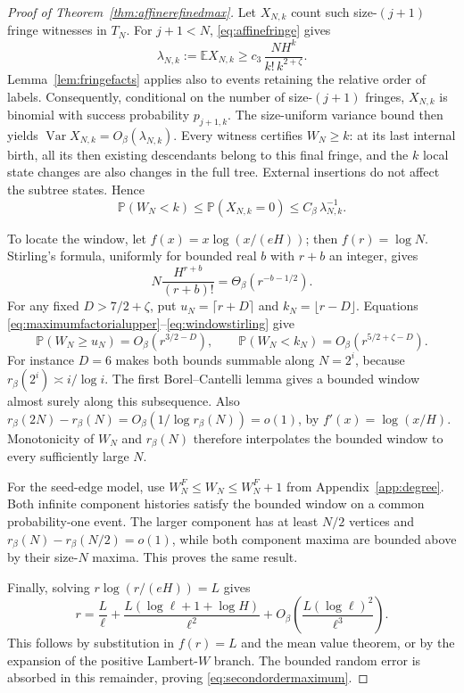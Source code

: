 \documentclass[runningheads,envcountsame,orivec]{llncs}
\newcommand{\E}{\mathbb E}
\newcommand{\PP}{\mathbb P}
\begin{document}
\begin{proof}[Proof of Theorem~\ref{thm:affinerefinedmax}]
Let $X_{N,k}$ count such size-$(j+1)$ fringe witnesses in $T_N$.
For $j+1<N$, \eqref{eq:affinefringe} gives
\begin{equation}\label{eq:witnessmean}
 \lambda_{N,k}:=\E X_{N,k}
 \ge c_3\,\frac{N H^k}{k!\,k^{2+\zeta}}.
\end{equation}
Lemma~\ref{lem:fringefacts}
applies also to events retaining the relative order of labels.
Consequently, conditional on the number of size-$(j+1)$ fringes,
$X_{N,k}$ is binomial with success probability $p_{j+1,k}$.
The size-uniform variance bound then yields
$\operatorname{Var}X_{N,k}=O_\beta(\lambda_{N,k})$.
Every witness certifies $W_N\ge k$: at its last internal birth,
all its then existing descendants belong to this final fringe,
and the $k$ local state changes are also changes in the full tree.
External insertions do not affect the subtree states. Hence
\begin{equation}\label{eq:witnessfailure}
 \PP(W_N<k)\le\PP(X_{N,k}=0)
 \le C_\beta\,\lambda_{N,k}^{-1}.
\end{equation}

To locate the window, let $f(x)=x\log(x/(eH))$; then
$f(r)=\log N$. Stirling's formula, uniformly for bounded real $b$
with $r+b$ an integer, gives
\begin{equation}\label{eq:windowstirling}
 N\frac{H^{r+b}}{(r+b)!}
 =\Theta_\beta(r^{-b-1/2}).
\end{equation}
For any fixed $D>7/2+\zeta$, put
$u_N=\lceil r+D\rceil$ and $k_N=\lfloor r-D\rfloor$.
Equations \eqref{eq:maximumfactorialupper}--\eqref{eq:windowstirling}
give
\[
 \PP(W_N\ge u_N)=O_\beta(r^{3/2-D}),\qquad
 \PP(W_N<k_N)=O_\beta(r^{5/2+\zeta-D}).
\]
For instance $D=6$ makes both bounds summable along $N=2^i$,
because $r_\beta(2^i)\asymp i/\log i$.
The first Borel--Cantelli lemma gives a bounded window almost surely
along this subsequence. Also
$r_\beta(2N)-r_\beta(N)=O_\beta(1/\log r_\beta(N))=o(1)$,
by $f'(x)=\log(x/H)$.
Monotonicity of $W_N$ and $r_\beta(N)$ therefore interpolates the
bounded window to every sufficiently large $N$.

For the seed-edge model, use $W_N^F\le W_N\le W_N^F+1$ from
Appendix~\ref{app:degree}. Both infinite component histories
satisfy the bounded window on a common probability-one event.
The larger component has at least $N/2$ vertices and
$r_\beta(N)-r_\beta(N/2)=o(1)$, while both component maxima are
bounded above by their size-$N$ maxima. This proves the same result.

Finally, solving $r\log(r/(eH))=L$ gives
\[
 r=\frac L\ell+
   \frac{L(\log\ell+1+\log H)}{\ell^2}
   +O_\beta\!\left(\frac{L(\log\ell)^2}{\ell^3}\right).
\]
This follows by substitution in $f(r)=L$ and the mean value theorem,
or by the expansion of the positive Lambert-$W$ branch.
The bounded random error is absorbed in this remainder, proving
\eqref{eq:secondordermaximum}.
\end{proof}
\end{document}
